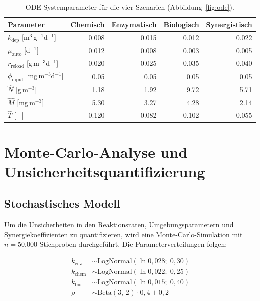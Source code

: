 ﻿\documentclass[12pt,a4paper]{article}
\theoremstyle{definition}
\theoremstyle{remark}
\begin{document}
\begin{table}[H]
\centering
\caption{ODE-Systemparameter für die vier Szenarien (Abbildung~\ref{fig:ode}).}
\label{tab:ode_params}
\begin{tabular}{lrrrr}
\toprule
\textbf{Parameter} & \textbf{Chemisch} & \textbf{Enzymatisch} & \textbf{Biologisch} & \textbf{Synergistisch} \\
\midrule
$k_{\text{dep}}$ [m$^3$\,g$^{-1}$d$^{-1}$] & 0.008 & 0.015 & 0.012 & 0.022 \\
$\mu_{\text{auto}}$ [d$^{-1}$] & 0.012 & 0.008 & 0.003 & 0.005 \\
$r_{\text{reload}}$ [g\,m$^{-3}$d$^{-1}$] & 0.020 & 0.025 & 0.035 & 0.040 \\
$\phi_{\text{input}}$ [mg\,m$^{-3}$d$^{-1}$] & 0.05 & 0.05 & 0.05 & 0.05 \\
$\hat{N}$ [g\,m$^{-3}$] & 1.18 & 1.92 & 9.72 & 5.71 \\
$\hat{M}$ [mg\,m$^{-3}$] & 5.30 & 3.27 & 4.28 & 2.14 \\
$\hat{T}$ [$-$] & 0.120 & 0.082 & 0.102 & 0.055 \\
\bottomrule
\end{tabular}
\end{table}

\section{Monte-Carlo-Analyse und Unsicherheitsquantifizierung}
\label{sec:montecarlo}

\subsection{Stochastisches Modell}

Um die Unsicherheiten in den Reaktionsraten, Umgebungsparametern und
Synergiekoeffizienten zu quantifizieren, wird eine Monte-Carlo-Simulation
mit $n = 50.000$ Stichproben durchgeführt. Die Parameterverteilungen folgen:

\begin{align}
  k_{\text{enz}} &\sim \text{LogNormal}(\ln 0{,}028;\; 0{,}30)
  \label{eq:mc_kenz}\\
  k_{\text{chem}} &\sim \text{LogNormal}(\ln 0{,}022;\; 0{,}25)
  \label{eq:mc_kchem}\\
  k_{\text{bio}} &\sim \text{LogNormal}(\ln 0{,}015;\; 0{,}40)
  \label{eq:mc_kbio}\\
  \rho &\sim \text{Beta}(3,\,2) \cdot 0{,}4 + 0{,}2
  \label{eq:mc_rho}
\end{align}
\end{document}
